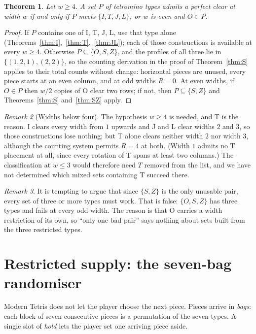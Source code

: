 \documentclass[11pt,a4paper]{article}
\theoremstyle{plain}
\newtheorem{theorem}{Theorem}
\theoremstyle{definition}
\theoremstyle{remark}
\newtheorem{remark}[theorem]{Remark}
\begin{document}
\begin{theorem}
\label{thm:sets}
Let $w \geq 4$. A set $P$ of tetromino types admits a perfect clear at width $w$ if
and only if $P$ meets $\{I, T, J, L\}$, or $w$ is even and $O \in P$.
\end{theorem}

\begin{proof}
If $P$ contains one of I, T, J, L, use that type alone
(Theorems~\ref{thm:I},~\ref{thm:T},~\ref{thm:JL}); each of those constructions is
available at every $w \geq 4$. Otherwise $P \subseteq \{O,S,Z\}$, and the profiles of
all three lie in $\{(1,2,1),(2,2)\}$, so the counting derivation in the proof of
Theorem~\ref{thm:S} applies to their total counts without change: horizontal pieces
are unused, every piece starts at an even column, and at odd widths $R = 0$. At even
widths, if $O \in P$ then $w/2$ copies of O clear two rows; if not, then $P \subseteq
\{S,Z\}$ and Theorems~\ref{thm:S} and~\ref{thm:SZ} apply.
\end{proof}

\begin{remark}[Widths below four]
The hypothesis $w \geq 4$ is needed, and T is the reason. I clears every width from
$1$ upwards and J and L clear widths $2$ and $3$, so those constructions lose nothing;
but T alone clears neither width $2$ nor width $3$, although the counting system
permits $R = 4$ at both. (Width $1$ admits no T placement at all, since every rotation
of T spans at least two columns.) The classification at $w \leq 3$ would therefore
need $T$ removed from the list, and we have not determined which mixed sets containing
T succeed there.
\end{remark}

\begin{remark}
It is tempting to argue that since $\{S,Z\}$ is the only unusable pair, every set of
three or more types must work. That is false: $\{O,S,Z\}$ has three types and fails
at every odd width. The reason is that O carries a width restriction of its own, so
``only one bad pair'' says nothing about sets built from the three restricted types.
\end{remark}

\section{Restricted supply: the seven-bag randomiser}
\label{sec:sevenbag}

Modern Tetris does not let the player choose the next piece. Pieces arrive in
\emph{bags}: each block of seven consecutive pieces is a permutation of the seven
types. A single slot of \emph{hold} lets the player set one arriving piece aside.
\end{document}
